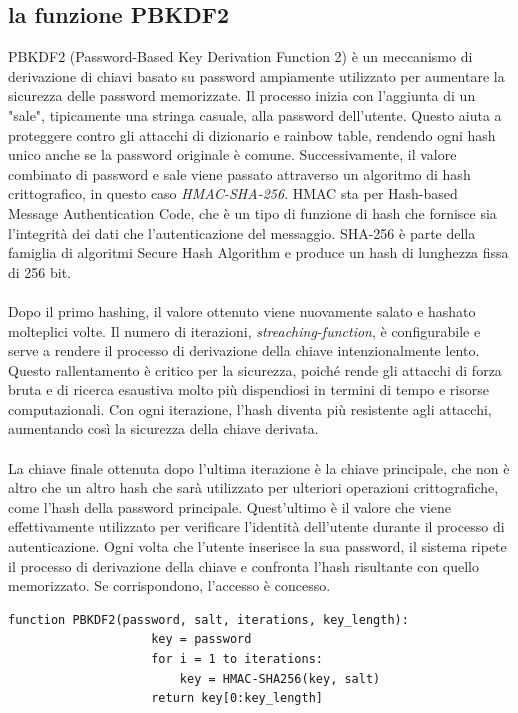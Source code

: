 \documentclass[a4paper,12pt]{report}
\begin{document}
		\subsection{la funzione PBKDF2}
			PBKDF2 (Password-Based Key Derivation Function 2) è un meccanismo di
			derivazione di chiavi basato su password ampiamente utilizzato per
			aumentare la sicurezza delle password memorizzate. Il processo inizia
			con l'aggiunta di un "sale", tipicamente una stringa casuale, alla
			password dell'utente. Questo aiuta a proteggere contro gli attacchi di
			dizionario e rainbow table, rendendo ogni hash unico anche se la
			password originale è comune. Successivamente, il valore combinato di
			password e sale viene passato attraverso un algoritmo di hash
			crittografico, in questo caso \textit{HMAC-SHA-256}. HMAC sta per Hash-based
			Message Authentication Code, che è un tipo di funzione di hash che
			fornisce sia l'integrità dei dati che l'autenticazione del messaggio.
			SHA-256 è parte della famiglia di algoritmi Secure Hash Algorithm e
			produce un hash di lunghezza fissa di 256 bit.\cite{PBKDF2}\\\\
			Dopo il primo hashing, il valore ottenuto viene nuovamente salato e hashato
			molteplici volte. Il numero di iterazioni, \textit{streaching-function}\cite{PBKDF2-streaching-function}, è
			configurabile e serve a rendere il processo di derivazione della chiave
			intenzionalmente lento. Questo rallentamento è critico per la sicurezza, poiché
			rende gli attacchi di forza bruta e di ricerca esaustiva molto più dispendiosi
			in termini di tempo e risorse computazionali. Con ogni iterazione, l'hash
			diventa più resistente agli attacchi, aumentando così la sicurezza della chiave
			derivata.\\\\
			La chiave finale ottenuta dopo l'ultima iterazione è la chiave principale, che
			non è altro che un altro hash che sarà utilizzato per ulteriori operazioni
			crittografiche, come l'hash della password principale. Quest'ultimo è il valore
			che viene effettivamente utilizzato per verificare l'identità dell'utente
			durante il processo di autenticazione. Ogni volta che l'utente inserisce la sua
			password, il sistema ripete il processo di derivazione della chiave e confronta
			l'hash risultante con quello memorizzato. Se corrispondono, l'accesso è
			concesso.
			\begin{lstlisting}[style=pseudocode]
				function PBKDF2(password, salt, iterations, key_length):
					key = password
					for i = 1 to iterations:
						key = HMAC-SHA256(key, salt)
					return key[0:key_length]
			\end{lstlisting}
\end{document}
